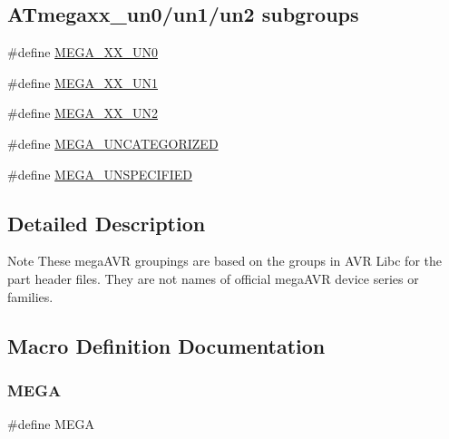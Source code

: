 \subsection*{A\+Tmegaxx\+\_\+un0/un1/un2 subgroups}
\begin{DoxyCompactItemize}
\item 
\#define \mbox{\hyperlink{group__mega__part__macros__group_gae1703e1537f2cbb10b4a8992c8b7b70b}{M\+E\+G\+A\+\_\+\+X\+X\+\_\+\+U\+N0}}
\item 
\#define \mbox{\hyperlink{group__mega__part__macros__group_gaad35e34280ef078dec0cc18c3ea6d3f6}{M\+E\+G\+A\+\_\+\+X\+X\+\_\+\+U\+N1}}
\item 
\#define \mbox{\hyperlink{group__mega__part__macros__group_ga5f4566d4ddaa3cee92d4c78162594f2d}{M\+E\+G\+A\+\_\+\+X\+X\+\_\+\+U\+N2}}
\item 
\#define \mbox{\hyperlink{group__mega__part__macros__group_ga9252d02a9216d5e9bf94000667ad6cb1}{M\+E\+G\+A\+\_\+\+U\+N\+C\+A\+T\+E\+G\+O\+R\+I\+Z\+ED}}
\item 
\#define \mbox{\hyperlink{group__mega__part__macros__group_gaabb3078f36ad4d875915bd54fa46f337}{M\+E\+G\+A\+\_\+\+U\+N\+S\+P\+E\+C\+I\+F\+I\+ED}}
\end{DoxyCompactItemize}


\subsection{Detailed Description}
\begin{DoxyNote}{Note}
These mega\+A\+VR groupings are based on the groups in A\+VR Libc for the part header files. They are not names of official mega\+A\+VR device series or families. 
\end{DoxyNote}


\subsection{Macro Definition Documentation}
\mbox{\label{group__mega__part__macros__group_ga78a6115b485de47c7cc56b224c558ea2}} 
\subsubsection{\texorpdfstring{MEGA}{MEGA}}
{\footnotesize\ttfamily \#define M\+E\+GA}

